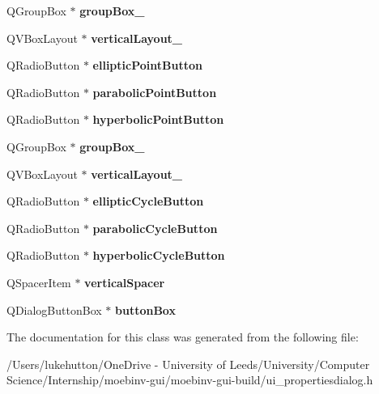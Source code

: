 \begin{DoxyCompactItemize}
Q\+Group\+Box $\ast$ {\bfseries group\+Box\+\_}
\item 
\mbox{\label{class_ui__properties_dialog_a7c81843ddff27d18375e13cfed9bfac0}} 
Q\+V\+Box\+Layout $\ast$ {\bfseries vertical\+Layout\+\_}
\item 
\mbox{\label{class_ui__properties_dialog_a9b2b3e033a44d84db89f5bf0c7977a3e}} 
Q\+Radio\+Button $\ast$ {\bfseries elliptic\+Point\+Button}
\item 
\mbox{\label{class_ui__properties_dialog_a86f31864696a9f676ad3fee8a0ef4ad6}} 
Q\+Radio\+Button $\ast$ {\bfseries parabolic\+Point\+Button}
\item 
\mbox{\label{class_ui__properties_dialog_ad4c33c681b44790fc4671f08d7b9fe2c}} 
Q\+Radio\+Button $\ast$ {\bfseries hyperbolic\+Point\+Button}
\item 
\mbox{\label{class_ui__properties_dialog_a5a9872252c004e5c3665e0de8a331d06}} 
Q\+Group\+Box $\ast$ {\bfseries group\+Box\+\_}
\item 
\mbox{\label{class_ui__properties_dialog_a73c069e1cd6743f2304c5a8ccf5b3de0}} 
Q\+V\+Box\+Layout $\ast$ {\bfseries vertical\+Layout\+\_}
\item 
\mbox{\label{class_ui__properties_dialog_acc387e99d883c6337a06bf7c767a58c4}} 
Q\+Radio\+Button $\ast$ {\bfseries elliptic\+Cycle\+Button}
\item 
\mbox{\label{class_ui__properties_dialog_aa6488e9cda300c6fb580ff1103e6a3e3}} 
Q\+Radio\+Button $\ast$ {\bfseries parabolic\+Cycle\+Button}
\item 
\mbox{\label{class_ui__properties_dialog_aeb4b1f6b0ff897d31e89dbe8689e223c}} 
Q\+Radio\+Button $\ast$ {\bfseries hyperbolic\+Cycle\+Button}
\item 
\mbox{\label{class_ui__properties_dialog_a7ef037d1f46fe6b15d6bd06be637cbf0}} 
Q\+Spacer\+Item $\ast$ {\bfseries vertical\+Spacer}
\item 
\mbox{\label{class_ui__properties_dialog_a1ccb0e1a0369f5ef66245528379f05a5}} 
Q\+Dialog\+Button\+Box $\ast$ {\bfseries button\+Box}
\end{DoxyCompactItemize}


The documentation for this class was generated from the following file\+:\begin{DoxyCompactItemize}
\item 
/\+Users/lukehutton/\+One\+Drive -\/ University of Leeds/\+University/\+Computer Science/\+Internship/moebinv-\/gui/moebinv-\/gui-\/build/ui\+\_\+propertiesdialog.\+h\end{DoxyCompactItemize}
